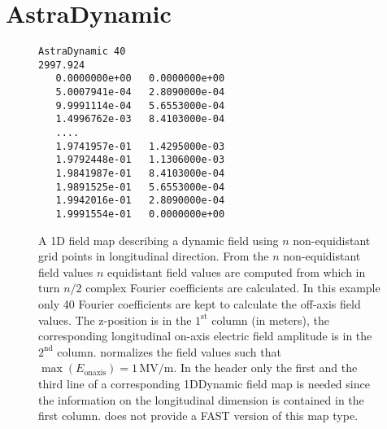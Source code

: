 \section{AstraDynamic}
\label{sec:AstraDynamic}
\begin{figure}[h]
\label{fig:1DDynamic}
\begin{fmpage}
\begin{verbatim}
AstraDynamic 40
2997.924
   0.0000000e+00   0.0000000e+00
   5.0007941e-04   2.8090000e-04
   9.9991114e-04   5.6553000e-04
   1.4996762e-03   8.4103000e-04
   ....
   1.9741957e-01   1.4295000e-03
   1.9792448e-01   1.1306000e-03
   1.9841987e-01   8.4103000e-04
   1.9891525e-01   5.6553000e-04
   1.9942016e-01   2.8090000e-04
   1.9991554e-01   0.0000000e+00
\end{verbatim}
\end{fmpage}
\caption[Example of an ASTRA compatible dynamic field map]{A 1D field map describing a dynamic field using $n$ non-equidistant grid points in longitudinal direction. From the $n$ non-equidistant field values $n$ equidistant field values are computed from which in turn $n/2$ complex Fourier coefficients are calculated. In this example only 40 Fourier coefficients are kept to calculate the off-axis field values. The z-position is in the $1^{\mathrm{st}}$ column (in meters), the corresponding longitudinal on-axis electric field amplitude is in the $2^{\mathrm{nd}}$ column. \opalt normalizes the field values such that $\max(E_{\text{onaxis}}) = 1\,\mathrm{MV/m}$. In the header only the first and the third line of a corresponding 1DDynamic field map is needed since the information on the longitudinal dimension is contained in the first column. \opalt does not provide a FAST version of this map type.
}
\end{figure}
\clearpage


